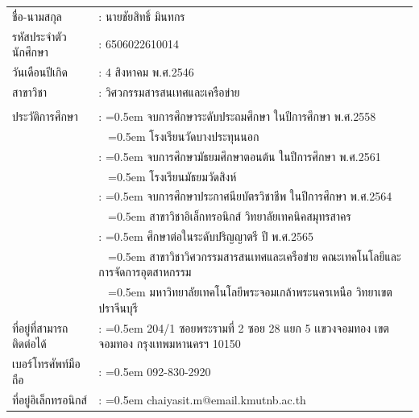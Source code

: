 \begin{tabularx}{\textwidth}{lX}
\\
ชื่อ-นามสกุล                    & : นายชัยสิทธิ์ มินทกร
\\
รหัสประจำตัวนักศึกษา           & : 6506022610014
\\
วันเดือนปีเกิด                  & : 4 สิงหาคม พ.ศ.2546
\\
สาขาวิชา                    & : วิศวกรรมสารสนเทศและเครือข่าย 
\\
\\
ประวัติการศึกษา                 
                            & : \hangindent=0.5em
                            จบการศึกษาระดับประถมศึกษา ในปีการศึกษา พ.ศ.2558 \\
                            & ~ \hangindent=0.5em โรงเรียนวัดบางประทุนนอก \\
                            & : \hangindent=0.5em
                            จบการศึกษามัธยมศึกษาตอนต้น ในปีการศึกษา พ.ศ.2561 \\
                            & ~ \hangindent=0.5em โรงเรียนมัธยมวัดสิงห์\\
                            & : \hangindent=0.5em
                            จบการศึกษาประกาศนียบัตรวิชาชีพ ในปีการศึกษา พ.ศ.2564 \\
                            & ~ \hangindent=0.5em สาขาวิชาอิเล็กทรอนิกส์ วิทยาลัยเทคนิคสมุทรสาคร \\
                            & : \hangindent=0.5em
                            ศึกษาต่อในระดับปริญญาตรี ปี พ.ศ.2565 \\
                            & ~ \hangindent=0.5em สาขาวิชาวิศวกรรมสารสนเทศและเครือข่าย คณะเทคโนโลยีและการจัดการอุตสาหกรรม \\
                            & ~ \hangindent=0.5em  มหาวิทยาลัยเทคโนโลยีพระจอมเกล้าพระนครเหนือ วิทยาเขตปราจีนบุรี
                            \\
ที่อยู่ที่สามารถติดต่อได้          & : \hangindent=0.5em
                            204/1 ซอยพระรามที่ 2 ซอย 28 แยก 5 เเขวงจอมทอง เขตจอมทอง กรุงเทพมหานครฯ 10150
                            \\
เบอร์โทรศัพท์มือถือ          & : \hangindent=0.5em
                            092-830-2920
                            \\
ที่อยู่อิเล็กทรอนิกส์          & : \hangindent=0.5em
                            chaiyasit.m@email.kmutnb.ac.th
\end{tabularx}

